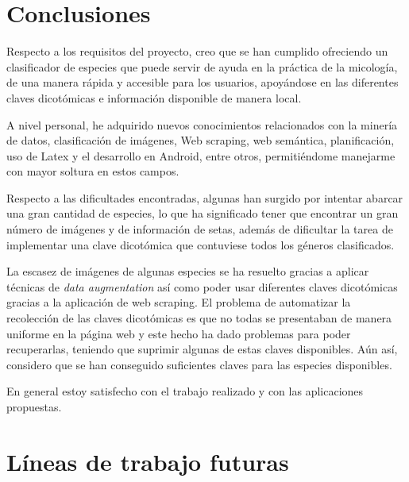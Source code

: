 


\section{Conclusiones}

Respecto a los requisitos del proyecto, creo que se han cumplido ofreciendo un clasificador de especies que puede servir de ayuda en la práctica de la micología, de una manera rápida y accesible para los usuarios, apoyándose en las diferentes claves dicotómicas e información disponible de manera local.

A nivel personal, he adquirido nuevos conocimientos relacionados con la minería de datos, clasificación de imágenes, Web scraping, web semántica, planificación, uso de Latex y  el desarrollo en Android, entre otros, permitiéndome manejarme con mayor soltura en estos campos.

Respecto a las dificultades encontradas, algunas han surgido por intentar abarcar una gran cantidad de especies, lo que ha significado tener que encontrar un gran número de imágenes y de información de setas, además de dificultar la tarea de implementar una clave dicotómica que contuviese todos los géneros clasificados.

La escasez de imágenes de algunas especies se ha resuelto gracias a aplicar técnicas de \textit{data augmentation} así como poder usar diferentes claves dicotómicas gracias a la aplicación de web scraping. El problema de automatizar la recolección de las claves dicotómicas es que no todas se presentaban de manera uniforme en la página web y este hecho ha dado problemas para poder recuperarlas, teniendo que suprimir algunas de estas claves disponibles. Aún así, considero que se han conseguido suficientes claves para las especies disponibles.

En general estoy satisfecho con el trabajo realizado y con las aplicaciones propuestas.

\section{Líneas de trabajo futuras}

